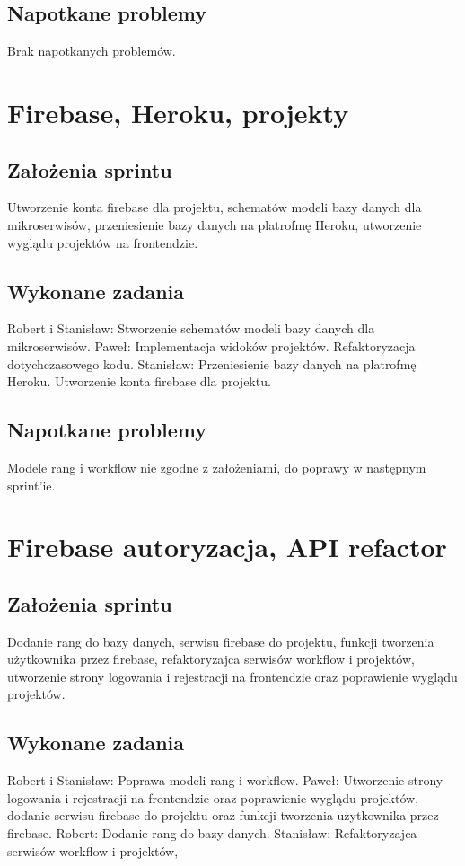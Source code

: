 \documentclass[a4paper,11pt]{report}
\begin{document}
\subsection {Napotkane problemy}
Brak napotkanych problemów.

\section {Firebase, Heroku, projekty}
\subsection {Założenia sprintu}
Utworzenie konta firebase dla projektu, schematów modeli bazy danych dla mikroserwisów, przeniesienie bazy danych na platrofmę Heroku, utworzenie wyglądu projektów na frontendzie.
\subsection {Wykonane zadania}
Robert i Stanisław: Stworzenie schematów modeli bazy danych dla mikroserwisów.
Paweł: Implementacja widoków projektów. Refaktoryzacja dotychczasowego kodu. 
Stanisław: Przeniesienie bazy danych na platrofmę Heroku. Utworzenie konta firebase dla projektu.
\subsection {Napotkane problemy}
Modele rang i workflow nie zgodne z założeniami, do poprawy w następnym sprint'ie.

\section {Firebase autoryzacja, API refactor}
\subsection {Założenia sprintu}
Dodanie rang do bazy danych, serwisu firebase do projektu, funkcji tworzenia użytkownika przez firebase, refaktoryzajca serwisów workflow i projektów, utworzenie strony logowania i rejestracji na frontendzie oraz poprawienie wyglądu projektów.
\subsection {Wykonane zadania}
Robert i Stanisław: Poprawa modeli rang i workflow.
Paweł: Utworzenie strony logowania i rejestracji na frontendzie oraz poprawienie wyglądu projektów, dodanie serwisu firebase do projektu oraz funkcji tworzenia użytkownika przez firebase.
Robert: Dodanie rang do bazy danych.
Stanisław: Refaktoryzajca serwisów workflow i projektów,
\end{document}
